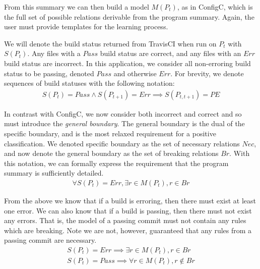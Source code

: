 From this summary we can then build a model $M(P_t)$, as in ConfigC, which is the full set of possible relations derivable from the program summary.
Again, the user must provide templates for the learning process.

We will denote the build status returned from TravisCI when run on $P_t$ with $S(P_t)$.
Any files with a $Pass$ build status are correct, and any files with an $Err$ build status are incorrect.
In this application, we consider all non-erroring build status to be passing, denoted $Pass$ and otherwise $Err$.
For brevity, we denote sequences of build statuses with the following notation:
\begin{align*}
  S(P_t)=Pass \land S(P_{t+1})=Err \implies S(P_{t,t+1}) = PE
\end{align*}

In contrast with ConfigC, we now consider both incorrect and correct and so must introduce the \textit{general boundary}.
The general boundary is the dual of the specific boundary, and is the most relaxed requirement for a positive classification.
We denoted specific boundary as the set of necessary relations $Nec$, and now denote the general boundary as the set of breaking relations $Br$.
With this notation, we can formally express the requirement that the program summary is sufficiently detailed.
\begin{align}
  \forall S(P_t)=Err, \exists r \in M(P_t), r \in Br \label{eq:E1}
\end{align}

From the above we know that if a build is erroring, then there must exist at least one error.
We can also know that if a build is passing, then there must not exist any errors.
That is, the model of a passing commit must not contain any rules which are breaking.
Note we are not, however, guaranteed that any rules from a passing commit are necessary.
\begin{align}
  S(P_t) = Err \implies \exists r \in  M (P_t), r \in Br \label{eq:E}\\
  S(P_t) = Pass \implies \forall r \in  M (P_t), r \notin Br \label{eq:P}
\end{align}

